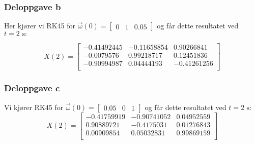 \subsubsection{Deloppgave b}
Her kjører vi RK45 for $\vec{\omega}(0) = \begin{bmatrix}0 & 1 & 0.05 \end{bmatrix}$ og får dette resultatet ved $t=2\text{ s}:$

\begin{equation}
    X(2) = \begin{bmatrix}
    -0.41492445 & -0.11658854 & 0.90266841 \\
    -0.0079576 & 0.99218717 & 0.12451836 \\
    -0.90994987 & 0.04444193 & -0.41261256 \\
    \end{bmatrix}
\end{equation}
\subsubsection{Deloppgave c}
Vi kjører RK45 for $\vec{\omega}(0)=\begin{bmatrix}0.05&0&1\end{bmatrix}$ og får dette resultatet ved $t=2\text{ s}:$
\begin{equation}
X(2)=
\begin{bmatrix}
-0.41759919 & -0.90741052 & 0.04952559\\
0.90889721 & -0.4175031 & 0.01276843\\
0.00909854 & 0.05032831 & 0.99869159\\
\end{bmatrix}
\end{equation}